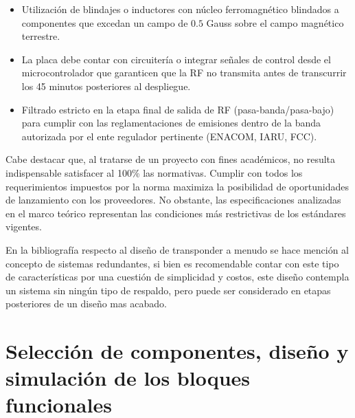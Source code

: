 \documentclass[11pt,a4paper,twoside]{report}
\begin{document}
\begin{itemize}
    \item Utilización de blindajes o inductores con núcleo ferromagnético blindados a componentes que  excedan un campo de $0.5$ Gauss sobre el campo magnético terrestre.
    
    \item La placa debe contar con circuitería o integrar señales de control desde el microcontrolador que garanticen que la RF no transmita antes de transcurrir los 45 minutos posteriores al despliegue.
    
    \item Filtrado estricto en la etapa final de salida de RF (pasa-banda/pasa-bajo) para cumplir con las reglamentaciones de emisiones dentro de la banda autorizada por el ente regulador pertinente (ENACOM, IARU, FCC).
	\end{itemize}
	
	Cabe destacar que, al tratarse de un proyecto con fines académicos, no resulta indispensable satisfacer al 100\% las normativas. Cumplir con todos los requerimientos impuestos por la norma maximiza la posibilidad de oportunidades de lanzamiento con los proveedores. No obstante, las especificaciones analizadas en el marco teórico representan las condiciones más restrictivas de los estándares vigentes.
	
	En la bibliografía respecto al diseño de transponder a menudo se hace mención al concepto de sistemas redundantes, si bien es recomendable contar con este tipo de características por una cuestión de simplicidad y costos, este diseño contempla un sistema sin ningún tipo de respaldo, pero puede ser considerado en etapas posteriores de un diseño mas acabado.
	
	\chapter{Selección de componentes, diseño y simulación de los bloques funcionales} 
	
\end{document}
